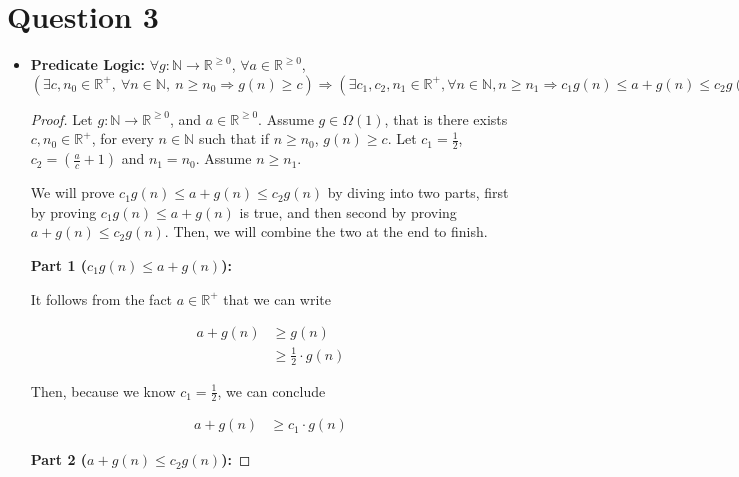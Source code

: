 \documentclass[12pt]{article}
\begin{document}
\section*{Question 3}
\begin{itemize}
    \item
    \textbf{Predicate Logic:} $\forall g:\mathbb{N} \to \mathbb{R}^{\geq 0}$,
    $\forall a \in \mathbb{R}^{\geq 0}$, $(\exists c,n_0 \in \mathbb{R}^{+},\:
    \forall n \in \mathbb{N},\:n \geq n_0 \Rightarrow g(n) \geq c) \Rightarrow
    (\exists c_1,c_2,n_1 \in \mathbb{R}^{+}, \forall n \in \mathbb{N}, n \geq n_1
    \Rightarrow c_1g(n) \leq  a + g(n) \leq c_2g(n))$

    \bigskip

    \begin{proof}
        Let $g:\mathbb{N} \to \mathbb{R}^{\geq 0}$, and $a \in \mathbb{R}^{\geq 0}$.
        Assume $g \in \Omega(1)$, that is there exists $c,n_0 \in \mathbb{R}^{+}$,
        for every $n \in \mathbb{N}$ such that if $n \geq n_0$, $g(n) \geq c$. Let
        $c_1 = \frac{1}{2}$, $c_2 = \left( \frac{a}{c} + 1 \right)$ and
        $n_1 = n_0$. Assume $n \geq n_1$.

        \bigskip

        We will prove $c_1g(n) \leq a + g(n) \leq c_2g(n)$ by diving into two parts,
        first by proving $c_1g(n) \leq a + g(n)$ is true, and then
        second by proving $a + g(n) \leq c_2g(n)$. Then, we will combine the two
        at the end to finish.

        \bigskip

        \textbf{Part 1 ($c_1g(n) \leq a + g(n)$):}

        \bigskip

        It follows from the fact $a \in \mathbb{R}^{+}$ that we can write

        \setcounter{equation}{0}
        \begin{align}
            a + g(n) &\geq g(n)\\
            &\geq \frac{1}{2} \cdot g(n)
        \end{align}

        \bigskip

        Then, because we know $c_1 = \frac{1}{2}$, we can conclude

        \begin{align}
            a + g(n) &\geq c_1 \cdot g(n)
        \end{align}

        \textbf{Part 2 ($a + g(n) \leq c_2g(n)$):}


\end{proof}
\end{itemize}
\end{document}
